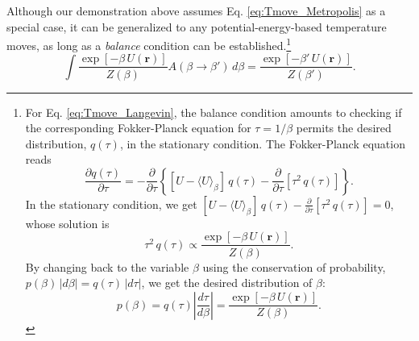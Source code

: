 \documentclass[11pt]{article}
\begin{document}
Although our demonstration above
assumes Eq. \eqref{eq:Tmove_Metropolis} as a special case,
it can be generalized to any potential-energy-based
temperature moves,
as long as a \emph{balance} condition
can be established.\footnote{
For Eq. \eqref{eq:Tmove_Langevin},
the balance condition amounts to checking if
the corresponding Fokker-Planck equation
for $\tau = 1/\beta$
permits the desired distribution, $q(\tau)$,
in the stationary condition.
%
The Fokker-Planck equation reads
$$
  \frac{ \partial q(\tau) } { \partial \tau }
  =
  -\frac{ \partial } { \partial \tau }
  \left\{
    [U - \langle U \rangle_\beta] \, q(\tau)
    -
    \frac{ \partial } { \partial \tau }
    \left[ \tau^2 \, q(\tau) \right]
  \right\}
  .
$$
In the stationary condition, we get
$ [U - \langle U \rangle_\beta] \, q(\tau)
    -
    \frac{ \partial } { \partial \tau }
    \left[ \tau^2 \, q(\tau) \right] = 0$,
whose solution is
$$
  \tau^2 \, q(\tau) \propto
  \frac{ \exp[-\beta \, U(\mathbf r)] } { Z(\beta) }.
$$
By changing back to the variable $\beta$
using the conservation of probability,
$ p(\beta) \, |d\beta| = q(\tau) \, |d\tau|$,
we get the desired distribution of $\beta$:
$$
  p(\beta) = q(\tau) \left| \frac{ d\tau } { d\beta } \right|
  =
  \frac{ \exp[-\beta \, U(\mathbf r)] } { Z(\beta) }
  .
$$
}
%
\begin{equation}
  \int
    \frac{ \exp\left[ -\beta \, U(\mathbf r) \right] }
         { Z( \beta ) }
    A(\beta \to \beta') \, d\beta
  =
    \frac{ \exp\left[ -\beta' \, U(\mathbf r) \right] }
         { Z( \beta' ) }
  .
\label{eq:beta_balance}
\end{equation}
%
\end{document}
